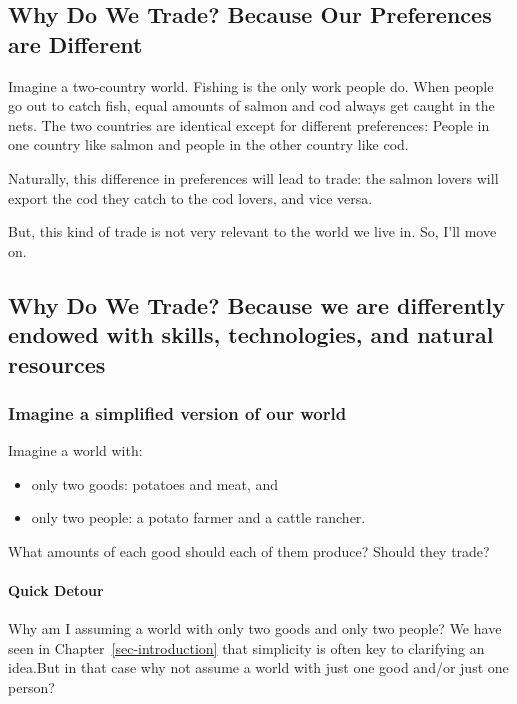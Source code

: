 \documentclass[
  letterpaper,
]{book}
\let\oldparagraph\paragraph
\renewcommand{\paragraph}[1]{\oldparagraph{#1}\mbox{}}
\begin{document}
\subsection{Why Do We Trade? Because Our Preferences are
Different}\label{why-do-we-trade-because-our-preferences-are-different}

Imagine a two-country world. Fishing is the only work people do. When
people go out to catch fish, equal amounts of salmon and cod always get
caught in the nets. The two countries are identical except for different
preferences: People in one country like salmon and people in the other
country like cod.

Naturally, this difference in preferences will lead to trade: the salmon
lovers will export the cod they catch to the cod lovers, and vice versa.

But, this kind of trade is not very relevant to the world we live in.
So, I'll move on.

\subsection{Why Do We Trade? Because we are differently endowed with
skills, technologies, and natural
resources}\label{why-do-we-trade-because-we-are-differently-endowed-with-skills-technologies-and-natural-resources}

\subsubsection{Imagine a simplified version of our
world}\label{imagine-a-simplified-version-of-our-world}

Imagine a world with:

\begin{itemize}
\item
  only two goods: potatoes and meat, and
\item
  only two people: a potato farmer and a cattle rancher.
\end{itemize}

What amounts of each good should each of them produce? Should they
trade?

\paragraph{Quick Detour}\label{quick-detour}

Why am I assuming a world with only two goods and only two people? We
have seen in Chapter~\ref{sec-introduction} that simplicity is often key
to clarifying an idea.But in that case why not assume a world with just
one good and/or just one person?
\end{document}
